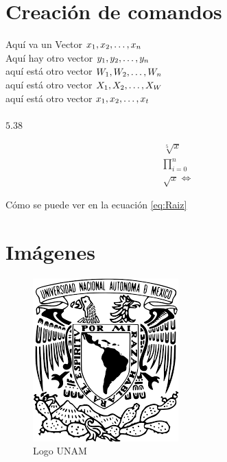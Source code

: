 \documentclass{article}
\begin{document}
	
	\renewcommand{\figurename}{Imagen}
	\renewcommand{\tablename}{Tabla}
	
	\renewcommand{\listtablename}{Índice de tablas}
	\renewcommand{\listfigurename}{Índice de imágenes}
	\renewcommand{\contentsname}{Índice general}
	
	
	\tableofcontents
	\listoffigures
	\listoftables
	
	\section{Creación de comandos}
	Aquí va un Vector $ x_1, x_2, \dots, x_n $\\
	Aquí hay otro vector $ y_1, y_2, \dots, y_n $\\
	 aquí está otro vector $ W_1, W_2, \dots, W_n $\\
	aquí está otro vector $ X_1, X_2, \dots, X_W $\\
	aquí está otro vector $ x_1, x_2, \dots, x_t $\\
	\\
	
	$ 5.38 $
	
	\begin{gather}
		 \sqrt[5]{x}\\
		\prod_{i=0}^{n}\\\label{eq:Raiz}
		\sqrt{x}\Leftrightarrow
	\end{gather}
	
	Cómo se puede ver en la ecuación \ref{eq:Raiz}
	
	\section{Imágenes}
	
	\begin{figure}[h]
		\centering
		\includegraphics[scale=0.5]{img/UNAM}
		\caption{Logo UNAM}
		\label{Fig:Logo}
	\end{figure}
	
\end{document}
